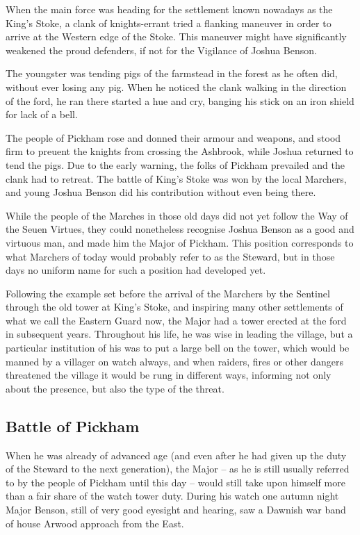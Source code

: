 \documentclass[twoside,11pt,b5paper,twocolumn]{scrbook}
\begin{document}
When the main force
was heading for the settlement
known nowadays as the King’s
Stoke, a clank of knights-errant
tried a flanking maneuver in order
to arrive at the Western edge of the
Stoke. This maneuver might have
significantly weakened the proud
defenders, if not for the Vigilance of
Joshua Benson.

The youngster was
tending pigs of the farmstead in the
forest as he
often did,
without
ever losing
any pig.
When he
noticed the clank
walking in the direction of the ford,
he ran there started a hue and cry,
banging his stick on an iron shield
for lack of a bell.

The people of
Pickham rose and donned their
armour and weapons, and stood
firm to preuent the knights from
crossing the Ashbrook, while Joshua
returned to tend the pigs. Due to the
early warning, the folks of
Pickham prevailed and the clank had
to retreat. The battle of King’s
Stoke was won by the local
Marchers, and young Joshua Benson
did his contribution without even
being there.

While the people
of the Marches in those old days did
not yet follow the Way of the Seuen
Virtues, they could nonetheless
recognise Joshua Benson as a good
and virtuous man, and made him
the Major of Pickham. This position
corresponds to what Marchers of
today would probably refer to as the
Steward, but in those days no
uniform name for such a position had
developed yet.

Following the example
set before the arrival of the Marchers
by the Sentinel through the old tower at King's Stoke, and
inspiring many other settlements of
what we call the Eastern Guard
now, the Major had a tower erected
at the ford in subsequent years.
Throughout his life, he was wise
in leading the village, but a
particular institution of his was to
put a large bell on the tower, which
would be manned by a villager on
watch always, and when raiders,
fires or other dangers threatened the
village it would be rung in
different ways, informing not only
about the presence, but also the type
of the threat.

\subsection{Battle of Pickham}
When he was already of
advanced age (and even
after he had given up the
duty of the Steward to the next generation), the
Major – as he is still usually referred
to by the people of Pickham until
this day – would still take upon
himself more than a fair share of the
watch tower duty. During his
watch one autumn night Major
Benson, still of very good eyesight
and hearing, saw a Dawnish war
band of house Arwood approach
from the East.
\end{document}
